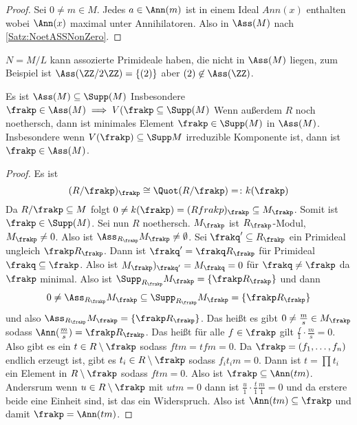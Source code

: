 \begin{proof}
	Sei \( 0 \neq m\in M\). Jedes \( a \in \Ann(m)\) ist in einem Ideal \(Ann(x)\) enthalten wobei \(\Ann(x)\) maximal unter 
	Annihilatoren. Also in \(\Ass(M)\) nach \cref{Satz:NoetASSNonZero}.
\end{proof}
\begin{Bsp} \(N=M/L\) kann assozierte Primideale haben, die nicht in \(\Ass(M)\) liegen, zum Beispiel ist
	\(\Ass(\ZZ/2\ZZ)=\{(2)\}\) aber \((2)\not\in \Ass(\ZZ)\).
	
\end{Bsp}
\begin{Satz} Es ist \(\Ass(M)\subseteq \Supp(M)\) Insbesondere \(\frakp\in\Ass(M) \implies V(\frakp\subseteq \Supp(M)\)
	Wenn außerdem \(R\) noch noethersch, dann ist minimales Element \(\frakp\in\Supp(M)\) in \(\Ass(M)\). Insbesondere wenn 
	\(V(\frakp)\subseteq\Supp M\)  irreduzible Komponente ist, dann ist \(\frakp\in \Ass(M)\).
	
\end{Satz}
\begin{proof}
	Es ist \[ (R/\frakp)_\frakp\cong\Quot(R/\frakp)=\colon k(\frakp)\]
	Da \(R/\frakp \subseteq M\) folgt \( 0\neq k(\frakp)=(R\/frakp)_\frakp\subseteq M_\frakp\).
	Somit ist \(\frakp\in\Supp(M)\).
	Sei nun \( R \) noethersch. \(M_\frakp\) ist \(R_\frakp\)-Modul, \(M_\frakp\neq 0\). Also ist \(\Ass_{R_\frakp}M_\frakp\neq \emptyset\).
	Sei \(\frakq'\subseteq R_\frakp\) ein Primideal ungleich \(\frakp R_\frakp\). Dann ist \(\frakq'=\frakq R_\frakp\) für
	Primideal \(\frakq\subseteq \frakp \).
	Also ist \(M_\frakp)_{\frakq'}=M_\frakq=0\) für \(\frakq\neq \frakp \) da \(\frakp\) minimal.
	Also ist \(\Supp_{R_\frakp}M_\frakp=\{\frakp R_\frakp\}\) und dann
	\[ 0\neq \Ass_{R_\frakp}M_\frakp \subseteq \Supp_{R_\frakp}M_\frakp = \{ \frakp R_\frakp\}\] und also 
	\(\Ass_{R_\frakp}M_\frakp = \{ \frakp R_\frakp \}\). Das heißt es gibt \(0\neq \frac m s \in M_\frakp \) sodass
	\(\Ann(\frac m s )=\frakp R_\frakp\). 
	Das heißt für alle \(f\in\frakp\) gilt \(\frac f 1\cdot \frac m s=0\). Also gibt es ein \(t\in R\setminus \frakp \) sodass
	\(ftm=tfm=0\). Da \(\frakp=(f_1,\dots,f_n)\) endlich erzeugt ist, gibt es \(t_i\in R\setminus\frakp\) sodass
	\(f_it_im=0\). Dann ist \(t=\prod t_i\) ein Element in \(R\setminus\frakp\) sodass \(ftm=0\). Also ist \(\frakp\subseteq \Ann(tm)\).
	Andersrum wenn \(u\in R\setminus\frakp\) mit \(utm=0\) dann ist 
	\(\frac u 1 \cdot \frac t 1 \frac m 1 =0\) und da erstere beide eine Einheit sind, ist das ein Widerspruch. 
	Also ist  \(\Ann(tm)\subseteq\frakp \) und damit \(\frakp=\Ann(tm)\).
\end{proof}
